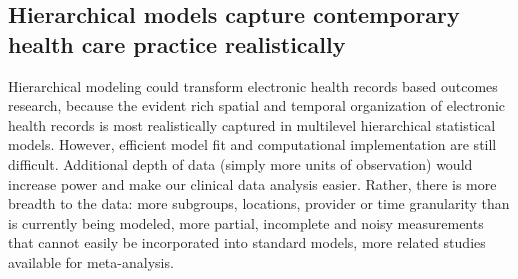 \documentclass[11pt,notitlepage]{article}
\begin{document}
\subsection*{Hierarchical models capture contemporary health care practice realistically}
Hierarchical modeling could transform electronic health records based outcomes research, because the evident rich spatial and temporal organization of electronic health records is most realistically captured in multilevel hierarchical statistical models. However, efficient model fit and computational implementation are still difficult.  Additional depth of data (simply more units of observation) would increase power and make our clinical data analysis easier. Rather, there is more breadth to the data: more subgroups, locations, provider or time granularity than is currently being modeled, more partial, incomplete and noisy measurements that cannot easily be incorporated into standard models, more related studies available for meta-analysis\cite{Andreae2015,Andreae2012}.

\end{document}
